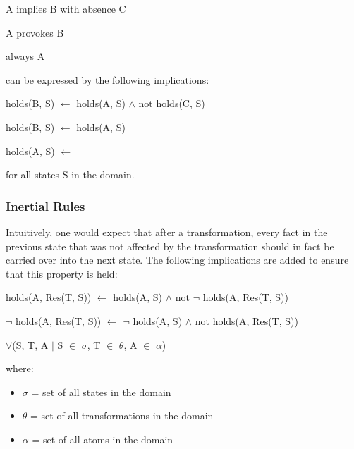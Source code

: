 \documentclass[a4paper]{article}
\begin{document}
      \begin{list}{}{}
        \item A implies B with absence C
        \item A provokes B
        \item always A
      \end{list}

        can be expressed by the following implications:

        \begin{list}{}{}
          \item 
            holds(B, S) $\leftarrow$ holds(A, S) $\land$ not holds(C, S)
          \item 
            holds(B, S) $\leftarrow$ holds(A, S)
          \item 
            holds(A, S) $\leftarrow$
        \end{list}

        for all states S in the domain.

      \subsubsection{Inertial Rules}

        Intuitively, one would expect that after a transformation, every fact
        in the previous state that was not affected by the transformation
        should in fact be carried over into the next state. The following
        implications are added to ensure that this property is held:

        \begin{list}{}{}
          \item
            holds(A, Res(T, S)) $\leftarrow$ holds(A, S) $\land$ not $\lnot$ 
            holds(A, Res(T, S))
          \item 
            $\lnot$ holds(A, Res(T, S)) $\leftarrow$ $\lnot$ holds(A, S) 
            $\land$ not holds(A, Res(T, S))
        \end{list}

        $\forall$(S, T, A $\mid$ S $\in$ $\sigma$, T $\in$ $\theta$, A $\in$ 
        $\alpha$)

        where: 

        \begin{itemize}
          \item $\sigma$ = set of all states in the domain
          \item $\theta$ = set of all transformations in the domain
          \item $\alpha$ = set of all atoms in the domain
        \end{itemize}
\end{document}
